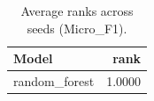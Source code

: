 \begin{table}[t]
\centering
\begin{tabular}{lr}
\toprule
Model & rank \\
\midrule
random_forest & 1.0000 \\
\bottomrule
\end{tabular}
\caption{Average ranks across seeds (Micro_F1).}
\label{tab:avg_rank_Micro_F1}
\end{table}
